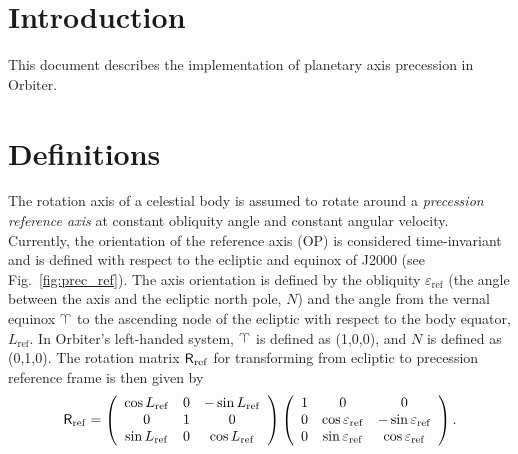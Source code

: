 \documentclass[a4paper]{article}
\renewcommand{\vec}[1]{\ensuremath \mathbf{#1}}
\newcommand{\mat}[1]{\ensuremath \mathsf{#1}}
\begin{document}



\newcommand{\vR}[1]{\ensuremath{\vec{R}_{#1}}}
\newcommand{\nR}[1]{\ensuremath{|\vR{#1}|}}

\maketitle

\section{Introduction}
This document describes the implementation of planetary axis precession in Orbiter.

\section{Definitions}
The rotation axis of a celestial body is assumed to rotate around a \emph{precession reference axis} at constant obliquity angle and constant angular velocity. Currently, the orientation of the reference axis (OP) is considered time-invariant and is defined with respect to the ecliptic and equinox of J2000 (see Fig.~\ref{fig:prec_ref}). The axis orientation is defined by the obliquity $\varepsilon_\mathrm{ref}$ (the angle between the axis and the ecliptic north pole, $N$) and the angle from the vernal equinox  $\vernal$ to the ascending node of the ecliptic with respect to the body equator, $L_\mathrm{ref}$.
In Orbiter's left-handed system, $\vernal$ is defined as (1,0,0), and $N$ is defined as (0,1,0). The rotation matrix $\mat{R}_\mathrm{ref}$ for transforming from ecliptic to precession reference frame is then given by
\begin{equation}
\mat{R}_\mathrm{ref} = \left( \begin{array}{ccc}
\cos L_\mathrm{ref} & 0 & -\sin L_\mathrm{ref} \\
0 & 1 & 0 \\
\sin L_\mathrm{ref} & 0 & \cos L_\mathrm{ref} \end{array} \right)
\left( \begin{array}{ccc}
1 & 0 & 0 \\
0 & \cos\varepsilon_\mathrm{ref} & -\sin\varepsilon_\mathrm{ref} \\
0  & \sin\varepsilon_\mathrm{ref} & \cos\varepsilon_\mathrm{ref}
\end{array} \right).
\end{equation}
\end{document}
